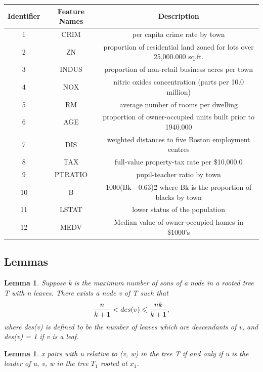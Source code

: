 \documentclass[12pt,a4paper]{article}
\newtheorem{lemma}[theorem]{Lemma}
\theoremstyle{definition}
\begin{document}
\begin{appendix}
\begin{table}[H]
	\begin{tabular}{c|c|c}
		\centering
		Identifier & Feature Names & Description \\
		\hline
		1 & CRIM & per capita crime rate by town \\
		2 & ZN & proportion of residential land zoned for lots over 25,000.000 sq.ft. \\
		3 & INDUS & proportion of non-retail business acres per town \\
		4 & NOX & nitric oxides concentration (parts per 10.0 million) \\
		5 & RM & average number of rooms per dwelling \\
		6 & AGE & proportion of owner-occupied units built prior to 1940.000 \\
		7 & DIS & weighted distances to five Boston employment centres \\
		8 & TAX & full-value property-tax rate per \$10,000.0 \\
		9 & PTRATIO & pupil-teacher ratio by town \\
		10 & B & 1000(Bk - 0.63)\^2 where Bk is the proportion of blacks by town \\
		11 & LSTAT & lower status of the population \\			
		12 & MEDV & Median value of owner-occupied homes in \$1000's \\
	\end{tabular}
\end{table}

\subsection{Lemmas}
\label{apd:lemma}

\begin{lemma}
	\label{lemma:1}
	Suppose k is the maximum number of sons of a node in a rooted tree T with n leaves. There exists a node v of T such that
	\begin{equation*}
		\centering
		\dfrac{n}{k+1} < des(v) \leqslant \dfrac{nk}{k+1},
	\end{equation*}
	where des(v) is defined to be the number of leaves which are descendants of v, and des(v) = 1 if v is a leaf.
\end{lemma}

\begin{lemma}
	\label{lemma:2}
	x pairs with u relative to (v, w) in the tree T if and only if u is the leader of u, v, w in the tree $T_1$ rooted at $x_1$.
\end{lemma}


\end{appendix}



\end{document}
